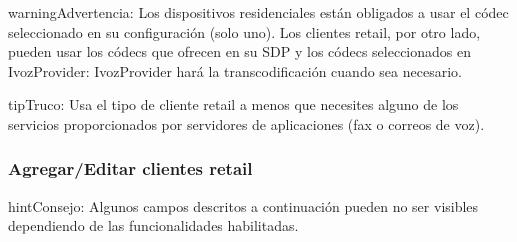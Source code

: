 \documentclass[letterpaper,10pt,spanish]{sphinxmanual}
\begin{document}
\begin{notice}{warning}{Advertencia:}
Los dispositivos residenciales están obligados a usar el códec seleccionado en su configuración (solo uno). Los clientes retail, por otro lado, pueden usar los códecs que ofrecen en su SDP y los códecs seleccionados en IvozProvider: IvozProvider hará la transcodificación cuando sea necesario.
\end{notice}

\begin{notice}{tip}{Truco:}
Usa el tipo de cliente retail a menos que necesites alguno de los servicios proporcionados por servidores de aplicaciones (fax o correos de voz).
\end{notice}


\subsubsection{Agregar/Editar clientes retail}
\label{administration_portal/brand/clients/retail:adding-editing-retail-clients}
\begin{notice}{hint}{Consejo:}
Algunos campos descritos a continuación pueden no ser visibles dependiendo de las funcionalidades habilitadas.
\end{notice}
\end{document}

